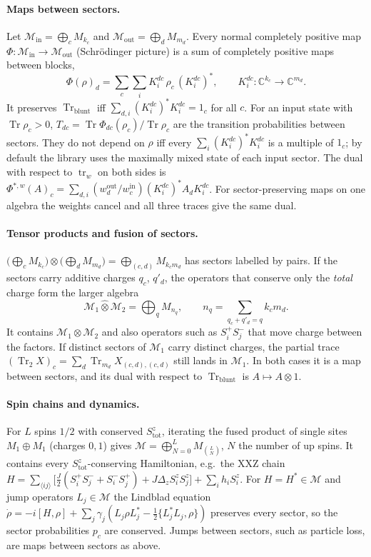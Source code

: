 \documentclass[11pt]{article}
\DeclareMathOperator{\Tr}{Tr}
\newcommand{\C}{\mathbb{C}}
\newcommand{\M}{\mathcal{M}}
\begin{document}
\paragraph{Maps between sectors.} Let $\M_{\mathrm{in}}=\bigoplus_c M_{k_c}$ and $\M_{\mathrm{out}}=\bigoplus_d
M_{m_d}$. Every normal completely positive map $\Phi:\M_{\mathrm{in}}\to\M_{\mathrm{out}}$ (Schrödinger picture) is a
sum of completely positive maps between blocks,
\[
  \Phi(\rho)_d=\sum_c\sum_i K^{dc}_i\,\rho_c\,(K^{dc}_i)^*,\qquad K^{dc}_i:\C^{k_c}\to\C^{m_d}.
\]
It preserves $\Tr_{\mathrm{blunt}}$ iff $\sum_{d,i}(K_i^{dc})^*K_i^{dc}=1_c$ for all $c$. For an input state with
$\Tr\rho_c>0$, $T_{dc}=\Tr\Phi_{dc}(\rho_c)/\Tr\rho_c$ are the transition probabilities between sectors. They do not
depend on $\rho$ iff every $\sum_i(K_i^{dc})^*K_i^{dc}$ is a multiple of $1_c$; by default the library uses the
maximally mixed state of each input sector. The dual with respect to $\operatorname{tr}_w$ on both sides is
$\Phi^{*,w}(A)_c=\sum_{d,i}(w^{\mathrm{out}}_d/w^{\mathrm{in}}_c)(K_i^{dc})^*A_dK_i^{dc}$. For sector-preserving maps on
one algebra the weights cancel and all three traces give the same dual.

\paragraph{Tensor products and fusion of sectors.} $\bigl(\bigoplus_cM_{k_c}\bigr)\otimes\bigl(\bigoplus_dM_{m_d}\bigr)
=\bigoplus_{(c,d)}M_{k_cm_d}$ has sectors labelled by pairs. If the sectors carry additive charges $q_c$, $q'_d$, the
operators that conserve only the \emph{total} charge form the larger algebra
\[
  \M_1\mathbin{\hat\otimes}\M_2=\bigoplus_q M_{n_q},\qquad n_q=\sum_{q_c+q'_d=q}k_cm_d .
\]
It contains $\M_1\otimes\M_2$ and also operators such as $S^+_iS^-_j$ that move charge between the factors. If distinct
sectors of $\M_1$ carry distinct charges, the partial trace $(\Tr_2X)_c=\sum_d\Tr_{m_d}X_{(c,d),(c,d)}$ still lands in
$\M_1$. In both cases it is a map between sectors, and its dual with respect to $\Tr_{\mathrm{blunt}}$ is $A\mapsto
A\otimes1$.

\paragraph{Spin chains and dynamics.} For $L$ spins $1/2$ with conserved $S^z_{\mathrm{tot}}$, iterating the fused
product of single sites $M_1\oplus M_1$ (charges $0,1$) gives $\M=\bigoplus_{N=0}^LM_{\binom LN}$, $N$ the number of up
spins. It contains every $S^z_{\mathrm{tot}}$-conserving Hamiltonian, e.g.\ the XXZ chain
$H=\sum_{\langle ij\rangle}\bigl[\tfrac J2(S^+_iS^-_j+S^-_iS^+_j)+J\Delta_zS^z_iS^z_j\bigr]+\sum_ih_iS^z_i$. For
$H=H^*\in\M$ and jump operators $L_j\in\M$ the Lindblad equation
$\dot\rho=-i[H,\rho]+\sum_j\gamma_j(L_j\rho L_j^*-\tfrac12\{L_j^*L_j,\rho\})$ preserves every sector, so the sector
probabilities $p_c$ are conserved. Jumps between sectors, such as particle loss, are maps between sectors as above.
\end{document}
